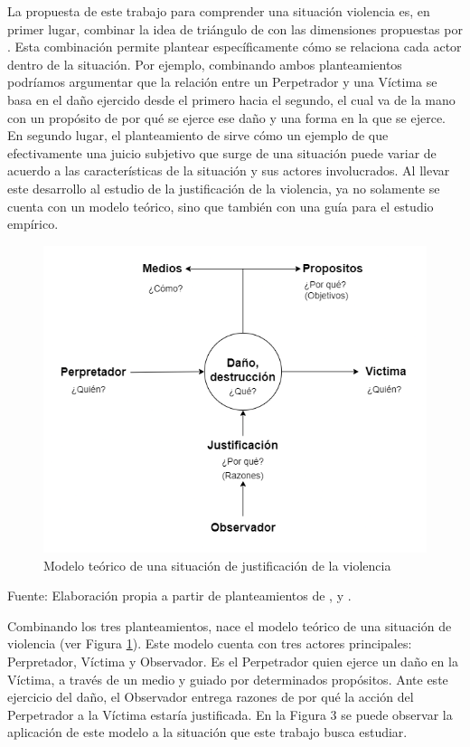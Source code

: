 \documentclass[12pt,twoside]{templates/facsothesis}
\begin{document}
La propuesta de este trabajo para comprender una situación violencia es, en primer lugar, combinar la idea de triángulo de \citet{Riches1986} con las dimensiones propuestas por \citet{Imbusch2005} . Esta combinación permite plantear específicamente cómo se relaciona cada actor dentro de la situación. Por ejemplo, combinando ambos planteamientos podríamos argumentar que la relación entre un Perpetrador y una Víctima se basa en el daño ejercido desde el primero hacia el segundo, el cual va de la mano con un propósito de por qué se ejerce ese daño y una forma en la que se ejerce. En segundo lugar, el planteamiento de \citet{Jasso2016} sirve cómo un ejemplo de que efectivamente una juicio subjetivo que surge de una situación puede variar de acuerdo a las características de la situación y sus actores involucrados. Al llevar este desarrollo al estudio de la justificación de la violencia, ya no solamente se cuenta con un modelo teórico, sino que también con una guía para el estudio empírico.

\begin{figure}[!ht]
\includegraphics[width=0.75\linewidth,]{images/absmodel} \caption{Modelo teórico de una situación de justificación de la violencia}\label{fig:absmodel}
\end{figure}

Fuente: Elaboración propia a partir de planteamientos de \citet{Riches1986}, \citet{Imbusch2005} y \citet{Jasso2016}.

Combinando los tres planteamientos, nace el modelo teórico de una situación de violencia (ver Figura \ref{fig:absmodel}). Este modelo cuenta con tres actores principales: Perpretador, Víctima y Observador. Es el Perpetrador quien ejerce un daño en la Víctima, a través de un medio y guiado por determinados propósitos. Ante este ejercicio del daño, el Observador entrega razones de por qué la acción del Perpetrador a la Víctima estaría justificada. En la Figura 3 se puede observar la aplicación de este modelo a la situación que este trabajo busca estudiar.
\end{document}

